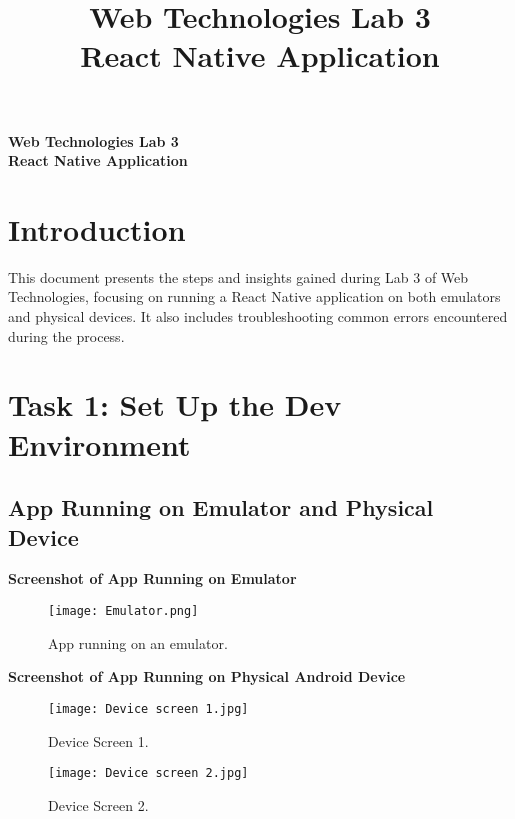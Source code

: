 \documentclass[a4paper,12pt]{article}
\title{Web Technologies Lab 3 \\ \large React Native Application}
\begin{document}
\begin{center}
    {\Large \textbf{Web Technologies Lab 3  \\ \large React Native Application}}\\[1em]
    
\end{center}

\tableofcontents

\newpage

\section{Introduction}
This document presents the steps and insights gained during Lab 3 of Web Technologies, focusing on running a React Native application on both emulators and physical devices. It also includes troubleshooting common errors encountered during the process.

\section{Task 1: Set Up the Dev Environment}

\subsection{ App Running on Emulator and Physical Device}
\textbf{Screenshot of App Running on Emulator}
\begin{figure}[H]
    \centering
    \texttt{[image: Emulator.png]}
    \caption{App running on an emulator.}
    \label{fig:emulator}
\end{figure}

\textbf{Screenshot of App Running on Physical Android Device}
\begin{figure}[H]
    \centering
    \begin{minipage}[b]{0.45\textwidth}
        \centering
        \texttt{[image: Device screen 1.jpg]} 
        \caption{Device Screen 1.}
        \label{fig:emulator}
    \end{minipage}
    \hspace{0.05\textwidth} 
    \begin{minipage}[b]{0.45\textwidth}
        \centering
        \texttt{[image: Device screen 2.jpg]} 
        \caption{Device Screen 2.}
        \label{fig:device}
    \end{minipage}
\end{figure}
\end{document}
